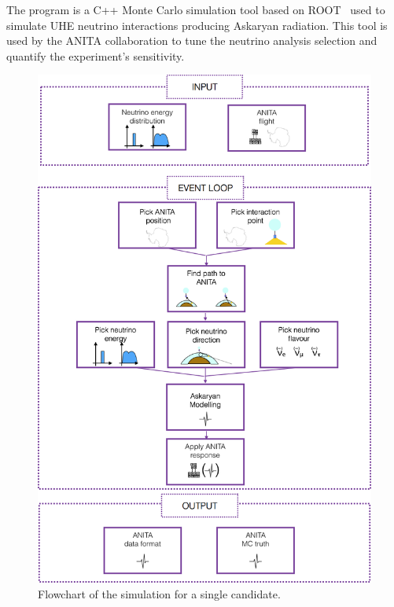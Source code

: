 The \icemc program is a C++ Monte Carlo simulation tool based on
ROOT~\cite{brun1997root} used to simulate UHE neutrino interactions producing Askaryan radiation. 
This tool is used by the ANITA collaboration to tune the neutrino
analysis selection and quantify the experiment's sensitivity.


\begin{figure}[!h]\centering
  \includegraphics[width=.8\linewidth]{./Figs/IcemcFlowchart.png}
  \caption{Flowchart of the \icemc simulation for a single candidate.}
  \label{fig:intro_icemcFlow}
\end{figure}

